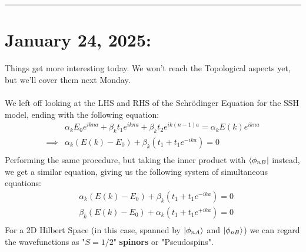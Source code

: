 \documentclass[11pt]{article}
\begin{document}
\vskip 1cm
\hrule

\pagebreak
\section{January 24, 2025:}

Things get more interesting today. We won't reach the Topological aspects yet, but we'll cover them next Monday.
\\
\\
We left off looking at the LHS and RHS of the Schr\"odinger Equation for the SSH model, ending with the following equation: 
\begin{align*}
  &\alpha_k E_0 e^{ikna} + \beta_k t_1 e^{ikna} + \beta_k t_2 e^{ik(n-1)a} = \alpha_k E(k) e^{ikna} \\
  \implies& \alpha_k (E(k) - E_0) + \beta_k (t_1 + t_1 e^{-ika}) = 0 \\
\end{align*} Performing the same procedure, but taking the inner product with $\langle\phi_{nB}\rvert$ instead, we get a similar equation, giving us the following system of simultaneous equations:
\begin{align*}
  & \alpha_k (E(k) - E_0) + \beta_k (t_1 + t_1 e^{-ika}) = 0 \\ 
  & \beta_k (E(k) - E_0) + \alpha_k (t_1 + t_1 e^{+ika}) = 0 \\ 
\end{align*} For a 2D Hilbert Space (in this case, spanned by $\lvert\phi_{nA}\rangle$ and $\lvert\phi_{nB}\rangle$) we can regard the wavefunctions as "$S = 1/2$" \textbf{spinors} or "Pseudospins". 
\\
\\
\end{document}
